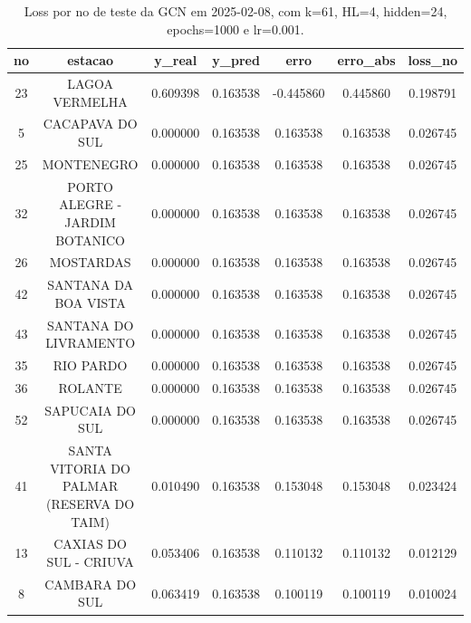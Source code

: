 \begin{table}[h]
\centering
\caption{Loss por no de teste da GCN em 2025-02-08, com k=61, HL=4, hidden=24, epochs=1000 e lr=0.001.}
\label{tab:gcn_loss_k61_hl4_h24_e1000_d20250208}
\begin{tabular}{ccccccc}
\toprule
no & estacao & y\_real & y\_pred & erro & erro\_abs & loss\_no \\
\midrule
23 & LAGOA VERMELHA & 0.609398 & 0.163538 & -0.445860 & 0.445860 & 0.198791 \\
5 & CACAPAVA DO SUL & 0.000000 & 0.163538 & 0.163538 & 0.163538 & 0.026745 \\
25 & MONTENEGRO & 0.000000 & 0.163538 & 0.163538 & 0.163538 & 0.026745 \\
32 & PORTO ALEGRE - JARDIM BOTANICO & 0.000000 & 0.163538 & 0.163538 & 0.163538 & 0.026745 \\
26 & MOSTARDAS & 0.000000 & 0.163538 & 0.163538 & 0.163538 & 0.026745 \\
42 & SANTANA DA BOA VISTA & 0.000000 & 0.163538 & 0.163538 & 0.163538 & 0.026745 \\
43 & SANTANA DO LIVRAMENTO & 0.000000 & 0.163538 & 0.163538 & 0.163538 & 0.026745 \\
35 & RIO PARDO & 0.000000 & 0.163538 & 0.163538 & 0.163538 & 0.026745 \\
36 & ROLANTE & 0.000000 & 0.163538 & 0.163538 & 0.163538 & 0.026745 \\
52 & SAPUCAIA DO SUL & 0.000000 & 0.163538 & 0.163538 & 0.163538 & 0.026745 \\
41 & SANTA VITORIA DO PALMAR (RESERVA DO TAIM) & 0.010490 & 0.163538 & 0.153048 & 0.153048 & 0.023424 \\
13 & CAXIAS DO SUL - CRIUVA & 0.053406 & 0.163538 & 0.110132 & 0.110132 & 0.012129 \\
8 & CAMBARA DO SUL & 0.063419 & 0.163538 & 0.100119 & 0.100119 & 0.010024 \\
\bottomrule
\end{tabular}
\end{table}
